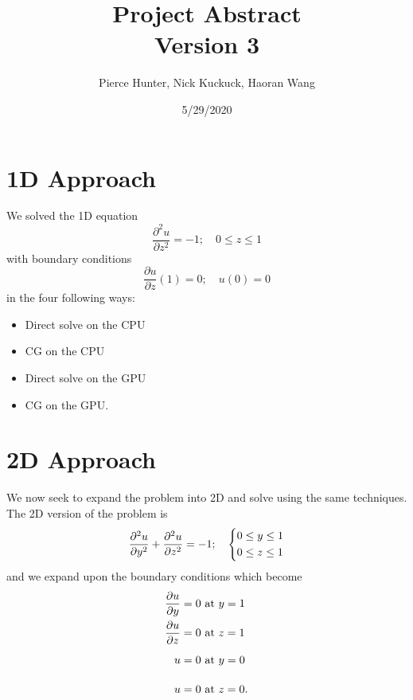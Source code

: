 \documentclass[10pt]{article}
\title{Project Abstract\\Version 3}
\author{Pierce Hunter, Nick Kuckuck, Haoran Wang}
\date{5/29/2020}
\newcommand{\pd}[2]{\frac{\partial #1}{\partial #2}}
\begin{document}
	\maketitle
	
	\section{1D Approach}
	We solved the 1D equation
	\begin{equation}
		\pd{^2u}{z^2} = -1; \quad 0\leq z\leq 1
	\end{equation}
	with boundary conditions
	\begin{equation}
		\pd{u}{z}\left(1\right) = 0; \quad u(0) = 0
	\end{equation}
	in the four following ways:
	\begin{itemize}
		\item Direct solve on the CPU
		\item CG on the CPU
		\item Direct solve on the GPU
		\item CG on the GPU.
	\end{itemize}
	\section{2D Approach}
	We now seek to expand the problem into 2D and solve using the same techniques. The 2D version of the problem is
	\begin{equation}
		\pd{^2u}{y^2} + \pd{^2u}{z^2} = -1; \quad \begin{dcases}
		0\leq y\leq 1\\
		0\leq z\leq 1
		\end{dcases}
	\end{equation}
	and we expand upon the boundary conditions which become
	\begin{align}
		\pd{u}{y} = 0&\text{ at }y=1\\
		\pd{u}{z} = 0&\text{ at }z=1\\
		u = 0&\text{ at }y=0\vphantom{\pd{u}{y}}\\
		u = 0&\text{ at }z=0\vphantom{\pd{u}{y}}.
	\end{align}
\end{document}
